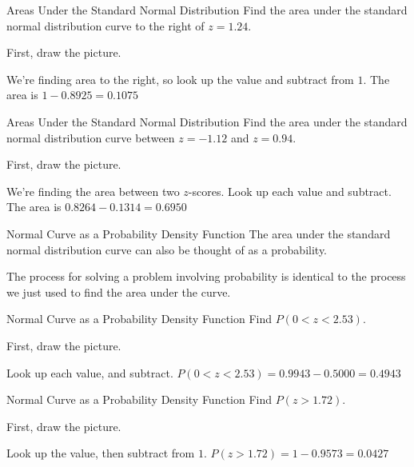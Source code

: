 \documentclass[t, aspectratio=169]{beamer}
\newcommand{\?}{\stackrel{?}{=}}
\begin{document}
	\begin{frame}{Areas Under the Standard Normal Distribution}
		Find the area under the standard normal distribution curve to the right of $z = 1.24$. \pause
		
		First, draw the picture. \vspace{1.75in} \pause
		
		We're finding area to the right, so look up the value and subtract from $1$. \pause The area is $1 - 0.8925 = 0.1075$
	\end{frame}

	\begin{frame}{Areas Under the Standard Normal Distribution}
		Find the area under the standard normal distribution curve between $z = -1.12$ and $z = 0.94$. \pause
		
		First, draw the picture. \vspace{1.6in} \pause
		
		We're finding the area between two $z$-scores. Look up each value and subtract. \pause The area is $0.8264 - 0.1314 = 0.6950$
	\end{frame}

	\begin{frame}{Normal Curve as a Probability Density Function}
		The area under the standard normal distribution curve can also be thought of as a probability. \pause
		
		The process for solving a problem involving probability is identical to the process we just used to find the area under the curve.
	\end{frame}

	\begin{frame}{Normal Curve as a Probability Density Function}
		Find $P(0 < z < 2.53)$. \pause
		
		First, draw the picture. \vspace{1.75in} \pause
		
		Look up each value, and subtract. \pause $P(0 < z < 2.53) = 0.9943 - 0.5000 = 0.4943$
	\end{frame}

	\begin{frame}{Normal Curve as a Probability Density Function}
		Find $P(z > 1.72)$. \pause
		
		First, draw the picture. \pause \vspace{1.75in}
		
		Look up the value, then subtract from $1$. \pause $P(z > 1.72) = 1 - 0.9573 = 0.0427$
	\end{frame}
\end{document}
